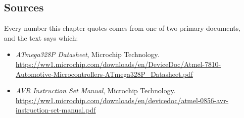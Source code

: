 \subsection*{Sources}
Every number this chapter quotes comes from one of two primary documents, and the text says
which:
\begin{itemize}
  \item \emph{ATmega328P Datasheet}, Microchip Technology.\\
    \url{https://ww1.microchip.com/downloads/en/DeviceDoc/Atmel-7810-Automotive-Microcontrollers-ATmega328P_Datasheet.pdf}
  \item \emph{AVR Instruction Set Manual}, Microchip Technology.\\
    \url{https://ww1.microchip.com/downloads/en/devicedoc/atmel-0856-avr-instruction-set-manual.pdf}
\end{itemize}
